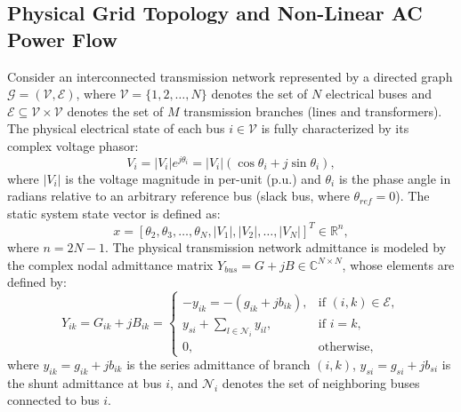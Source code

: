 \documentclass[journal,compsoc]{IEEEtran}
\begin{document}
\subsection{Physical Grid Topology and Non-Linear AC Power Flow}
Consider an interconnected transmission network represented by a directed graph $\mathcal{G} = (\mathcal{V}, \mathcal{E})$, where $\mathcal{V} = \{1, 2, \dots, N\}$ denotes the set of $N$ electrical buses and $\mathcal{E} \subseteq \mathcal{V} \times \mathcal{V}$ denotes the set of $M$ transmission branches (lines and transformers). The physical electrical state of each bus $i \in \mathcal{V}$ is fully characterized by its complex voltage phasor:
\begin{equation}
    V_i = |V_i| e^{j \theta_i} = |V_i| (\cos \theta_i + j \sin \theta_i),
\end{equation}
where $|V_i|$ is the voltage magnitude in per-unit (p.u.) and $\theta_i$ is the phase angle in radians relative to an arbitrary reference bus (slack bus, where $\theta_{ref} = 0$). The static system state vector is defined as:
\begin{equation}
    x = [\theta_2, \theta_3, \dots, \theta_N, |V_1|, |V_2|, \dots, |V_N|]^T \in \mathbb{R}^n,
\end{equation}
where $n = 2N - 1$. The physical transmission network admittance is modeled by the complex nodal admittance matrix $Y_{bus} = G + jB \in \mathbb{C}^{N \times N}$, whose elements are defined by:
\begin{equation}
    Y_{ik} = G_{ik} + j B_{ik} = 
    \begin{cases}
        -y_{ik} = -(g_{ik} + j b_{ik}), & \text{if } (i, k) \in \mathcal{E}, \\
        y_{si} + \sum_{l \in \mathcal{N}_i} y_{il}, & \text{if } i = k, \\
        0, & \text{otherwise},
    \end{cases}
\end{equation}
where $y_{ik} = g_{ik} + j b_{ik}$ is the series admittance of branch $(i, k)$, $y_{si} = g_{si} + j b_{si}$ is the shunt admittance at bus $i$, and $\mathcal{N}_i$ denotes the set of neighboring buses connected to bus $i$.
\end{document}
